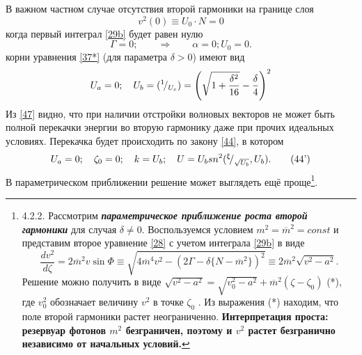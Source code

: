 \documentclass[a4paper]{article}
\begin{document}
	В важном частном случае отсутствия второй гармоники на границе слоя 
	\begin{equation}
		v^{2}(0)\equiv U_{0}\cdot N=0\label{46}
	\end{equation}
	когда первый интеграл \eqref{29b} будет равен нулю $$\Gamma=0;\qquad\Rightarrow\qquad\alpha=0; U_{0}=0.$$
	корни уравнения \eqref{37*} (для параметра $\delta>0$) имеют вид 
	\begin{equation}
		U_{a}=0;\quad U_{b}=({}^{1}\!/_{U_{c}})=\left(\sqrt{1+\frac{\delta^{2}}{16}}-\frac{\delta}{4}\right)^{2}\label{47}
	\end{equation}
	Из \eqref{47} видно, что при наличии отстройки волновых векторов не может быть полной перекачки энергии во вторую гармонику даже при прочих идеальных условиях. Перекачка будет происходить по закону \eqref{44}, в котором 
	\begin{equation}
		U_{a}=0;\quad\zeta_{0}=0;\quad k=U_{b};\quad U=U_{b}sn^{2}({}^{\xi}\!/_{\sqrt{U_{b}}},U_{b}).\tag{44'}\label{44'}
	\end{equation}
	\newpage
	В параметрическом приближении решение может выглядеть ещё проще\footnote{4.2.2. Рассмотрим \textit{\textbf{параметрическое приближение роста второй гармоники}} для случая $\delta\neq0$. Воспользуемся условием $m^{2}=\overline{m}^{2}=const$  и представим второе уравнение \eqref{28} с учетом интеграла \eqref{29b} в виде $$\frac{dv^{2}}{d\zeta}=2\overline{m}^{2}v\sin\Phi\equiv\sqrt{4\overline{m}^{4}v^{2}-\left(2\Gamma-\delta\{N-\overline{m}^{2}\}\right)^{2}}\equiv2\overline{m}^{2}\sqrt{v^{2}-a^{2}}.$$
	Решение можно получить в виде $\sqrt{v^{2}-a^{2}}=\sqrt{v^{2}_{0}-a^{2}}+\overline{m}^{2}(\zeta-\zeta_{0})$ (*),  где  $v_{0}^{2}$ обозначает величину $v^{2}$ в точке $\zeta_{0}$ . Из выражения (*) находим, что поле второй гармоники растет неограниченно. \textbf{Интерпретация проста: резервуар фотонов $m^{2}$ безграничен, поэтому и $v^{2}$ растет безгранично независимо от начальных условий.}}. 
\end{document}
